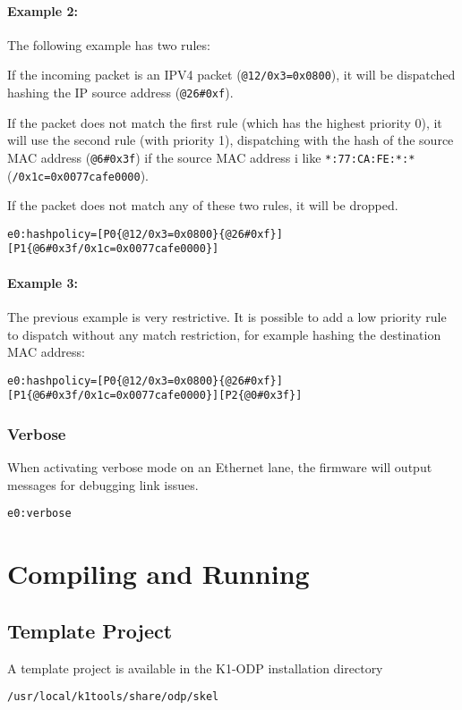 \documentclass{trkalray}
\begin{document}
\paragraph{Example 2:}

The following example has two rules:

If the incoming packet is an IPV4 packet (\texttt{@12/0x3=0x0800}),
 it will be dispatched hashing the IP source address
 (\texttt{@26\#0xf}).

If the packet does not match the first rule
(which has the highest priority 0), it will use the second rule (with
priority 1), dispatching with the hash of the source MAC address
(\texttt{@6\#0x3f}) if the source MAC address i like
\texttt{*:77:CA:FE:*:*} (\texttt{/0x1c=0x0077cafe0000}).

If the packet
does not match any of these two rules, it will be dropped.
\begin{lstlisting}
e0:hashpolicy=[P0{@12/0x3=0x0800}{@26#0xf}][P1{@6#0x3f/0x1c=0x0077cafe0000}]
\end{lstlisting}

\paragraph{Example 3:}

The previous example is very restrictive. It is possible to add a low priority
rule to dispatch without any match restriction, for example hashing the
destination MAC address:
\begin{lstlisting}
e0:hashpolicy=[P0{@12/0x3=0x0800}{@26#0xf}][P1{@6#0x3f/0x1c=0x0077cafe0000}][P2{@0#0x3f}]
\end{lstlisting}

\subsubsection{Verbose}

When activating verbose mode on an Ethernet lane, the firmware will
output messages for debugging link issues.
\begin{lstlisting}
e0:verbose
\end{lstlisting}

\section{Compiling and Running}

\subsection{Template Project}
A template project is available in the K1-ODP installation directory
\begin{lstlisting}
/usr/local/k1tools/share/odp/skel
\end{lstlisting}
\end{document}
